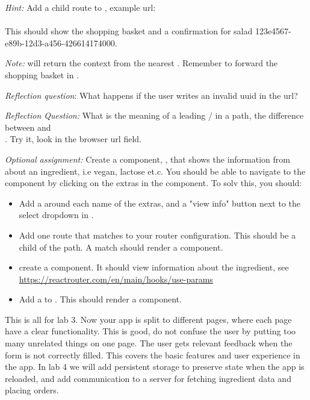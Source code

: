 \documentclass[fleqn, article, a4paper]{memoir}
\begin{document}
\begin{Assignments}
\emph{Hint:} Add a child route to , example url:\\ \\ This should show the shopping basket and a confirmation for salad 123e4567-e89b-12d3-a456-426614174000.

\emph{Note:}  will return the context from the nearest . Remember to forward the shopping basket in .

\emph{Reflection question}: What happens if the user writes an invalid uuid in the url?

\emph{Reflection Question:} What is the meaning of a leading / in a path, the difference between  and \\ . Try it, look in the browser url field.

\item \emph{Optional assignment:} Create a component, , that shows the information from  about an ingredient, i.e vegan, lactose et.c. You should be able to navigate to the  component by clicking on the extras in the  component. To solv this, you should:
\begin{itemize}
  \item Add a  around each name of the extras, and a "view info" button next to the select dropdown in .
  \item Add one route that matches  to your router configuration. This should be a child of the  path. A match should render a  component.
  \item create a  component. It should view information about the  ingredient, see \url{https://reactrouter.com/en/main/hooks/use-params}
  \item Add a  to . This should render a  component.
\end{itemize}

\item This is all for lab 3. Now your app is split to different pages, where each page have a clear functionality. This is good, do not confuse the user by putting too many unrelated things on one page. The user gets relevant feedback when the form is not correctly filled. This covers the basic features and user experience in the app. In lab 4 we will add persistent storage to preserve state when the app is reloaded, and add communication to a server for fetching ingredient data and placing orders.

\end{Assignments}


\end{document}
